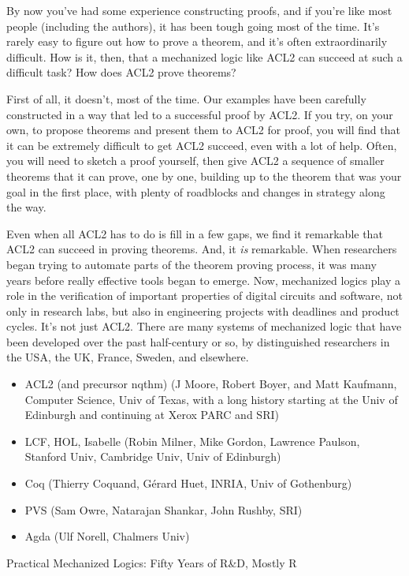 By now you've had some experience constructing proofs, and if you're like most people
(including the authors), it has been tough going most of the time.
It's rarely easy to figure out how to prove a theorem,
and it's often extraordinarily difficult.
How is it, then, that a mechanized logic like ACL2 can succeed at such a difficult task?
How does ACL2 prove theorems?

First of all, it doesn't, most of the time.
Our examples have been carefully constructed in a way that
led to a successful proof by ACL2.
If you try, on your own, to propose theorems
and present them to ACL2 for proof, you will find that it can be
extremely difficult to get ACL2 succeed, even with a lot of help.
Often, you will need to sketch a proof yourself,
then give ACL2 a sequence of smaller theorems
that it can prove, one by one, building up to
the theorem that was your goal in the first place,
with plenty of roadblocks and changes in strategy along the way.

Even when all ACL2 has to do is fill in a few gaps,
we find it remarkable that ACL2 can succeed in proving theorems.
And, it \emph{is} remarkable.
When researchers began trying to automate parts
of the theorem proving process, it was many years
before really effective tools began to emerge.
Now, mechanized logics play a role in
the verification of important properties of digital circuits and
software, not only in research labs,
but also in engineering projects with deadlines and product cycles.
It's not just ACL2. There are many systems of mechanized logic that
have been developed over the past half-century or so,
by distinguished researchers in the USA, the UK, France, Sweden, and elsewhere.

\begin{aside}
\begin{itemize}
\item ACL2 (and precursor nqthm) (J Moore, Robert Boyer, and Matt Kaufmann, Computer Science, Univ of Texas, with a long history starting at the Univ of Edinburgh and continuing at Xerox PARC and SRI)
\item LCF, HOL, Isabelle (Robin Milner, Mike Gordon, Lawrence Paulson, Stanford Univ, Cambridge Univ, Univ of Edinburgh)
\item Coq (Thierry Coquand, G\'erard Huet, INRIA, Univ of Gothenburg)
\item PVS (Sam Owre, Natarajan Shankar, John Rushby, SRI)
\item Agda (Ulf Norell, Chalmers Univ)
\end{itemize}
\caption{Practical Mechanized Logics: Fifty Years of R\&D, Mostly R}
\label{mechanized-logic-history}
\end{aside}

